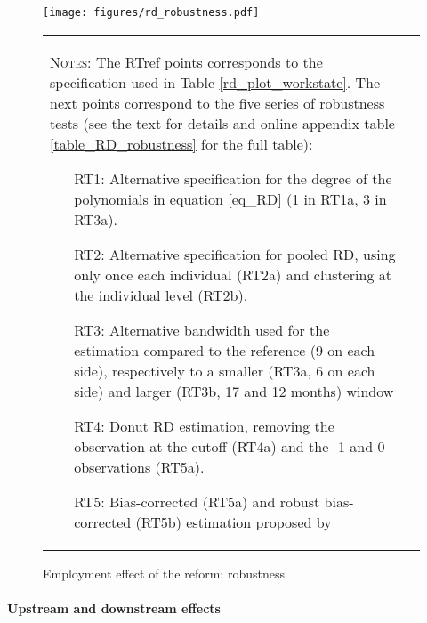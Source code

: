 \documentclass[12pt,a4paper]{article}
\begin{document}
\begin{figure}[!t] 
\caption{Employment effect of the reform: robustness}
\footnotesize
\label{fig_robustness}
\centering
\texttt{[image: figures/rd\_robustness.pdf]}
\vspace*{0.2cm}
\scriptsize
\begin{tabular}{ll}
\begin{minipage}{15cm}%
	\textsc{Notes:} The RTref points corresponds to the specification used in Table \ref{rd_plot_workstate}. The next points correspond to the five series of robustness tests (see the text for details and online appendix table \ref{table_RD_robustness} for the full table):
	\begin{itemize}[label=-,leftmargin=1cm ,parsep=0cm,itemsep=0cm,topsep=0cm]
		\item[RT1:] Alternative specification for the degree of the polynomials in equation \ref{eq_RD} (1 in RT1a, 3 in RT3a).   
		\item[RT2:] Alternative specification for pooled RD, using only once each individual (RT2a) and clustering at the individual level (RT2b). 
		\item[RT3:] Alternative bandwidth used for the estimation compared to the reference (9 on each side), respectively to a smaller (RT3a, 6 on each side) and larger (RT3b, 17 and 12 months) window	
		\item[RT4:] Donut RD estimation, removing the observation at the cutoff (RT4a) and the -1 and 0 observations (RT5a). 
		\item[RT5:] Bias-corrected (RT5a) and robust bias-corrected (RT5b) estimation proposed by \cite{calonico2014robust}
	\end{itemize}
\end{minipage}%
\end{tabular}
\normalsize
\end{figure}

\paragraph{Upstream and downstream effects} 
\end{document}
